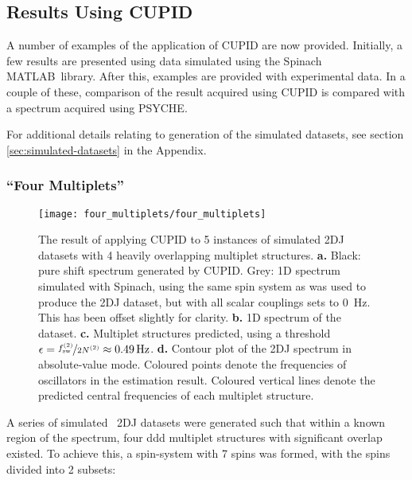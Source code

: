 \subsection{Results Using \acs{CUPID}}
\label{subsec:cupid-results}
A number of examples of the application of \ac{CUPID} are now provided.
Initially, a few results are presented using data simulated using the Spinach
MATLAB\textregistered\ library\cite{Hogben2011}.
After this, examples are provided with experimental data. In a couple of these,
comparison of the result acquired using \ac{CUPID} is compared with a spectrum
acquired using \ac{PSYCHE}.

For additional details relating to generation of the simulated datasets, see
section \ref{sec:simulated-datasets} in the Appendix.

\subsubsection{``Four Multiplets''}
\begin{figure}
    \centering
    \texttt{[image: four\_multiplets/four\_multiplets]}
    \caption[
        The result of applying \acs{CUPID} to 5 instances of simulated
        \acs{2DJ} datasets with 4 heavily overlapping multiplet structures.
    ]{
        The result of applying \ac{CUPID} to 5 instances of simulated \ac{2DJ}
        datasets with 4 heavily overlapping multiplet structures.
        \textbf{a.} Black: pure shift spectrum generated by \ac{CUPID}.
        Grey: \ac{1D} spectrum simulated with Spinach, using the same spin
        system as was used to produce the \ac{2DJ} dataset, but with all scalar
        couplings sets to \qty{0}{\hertz}. This has been offset slightly for
        clarity.
        \textbf{b.} \ac{1D} spectrum of the dataset.
        \textbf{c.} Multiplet structures predicted, using a threshold $\epsilon
        = \nicefrac{f_{\mathrm{sw}}^{(2)}}{2 N^{(2)}} \approx \qty{0.49}{\hertz}$.
        \textbf{d.} Contour plot of the \ac{2DJ} spectrum in absolute-value
        mode. Coloured points denote the frequencies of oscillators in the
        estimation result.
        Coloured vertical lines denote the predicted central frequencies of
        each multiplet structure.
    }
    \label{fig:four-multiplets}
\end{figure}
A series of simulated \proton\ \ac{2DJ} datasets were generated such that
within a known region of the spectrum, four ddd multiplet structures with
significant overlap existed. To achieve this, a spin-system with 7 spins was
formed, with the spins divided into 2 subsets:

